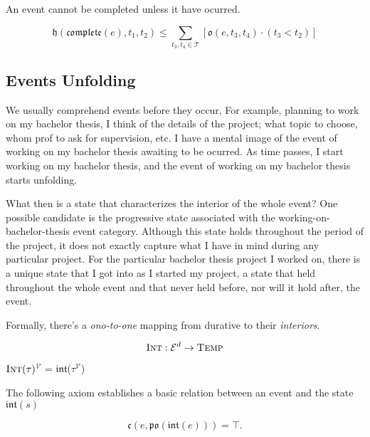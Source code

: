 An event cannot be completed unless it have ocurred.

\begin{axiom}
	\begin{equation}
		\mathfrak{h}(\mathfrak{complete}(e), t_1, t_2) \leq \sum_{t_3, t_4 \in \mathcal{T}}[\mathfrak{o}(e, t_3, t_4) \cdot (t_3 < t_2)]
	\end{equation}
\end{axiom}

\subsection{Events Unfolding}
We usually comprehend events before they occur, For example, planning to work on my bachelor thesis,
I think of the details of the project; what topic to choose, whom prof to ask for supervision, etc.
I have a mental image of the event of working on my bachelor thesis awaiting to be ocurred.
As time passes, I start working on my bachelor thesis, and the event of working on my bachelor thesis starts unfolding.

What then is a state that characterizes the interior of the whole event? One possible candidate is the progressive state associated with the working-on-bachelor-thesis event category.
Although this state holds throughout the period of the project, it does not exactly capture what I have in mind during any particular project.
For the particular bachelor thesis project I worked on, there is a unique state that I got into as I started my project, a state that held throughout the whole event and that never held before, nor will it hold after, the event.

Formally, there's a \textit{ono-to-one} mapping from durative to their \textit{interiors}.
\begin{defn}
	\begin{equation}
		\textsc{Int} : \mathcal{E}^{d} \to \textsc{Temp}
	\end{equation}
\end{defn}

\begin{defn}
	\textlbrackdbl $\textsc{Int}(\tau)$\textrbrackdbl$^{\mathcal{V}}$
	= $\mathfrak{int}$(\textlbrackdbl $\tau$\textrbrackdbl$^{\mathcal{V}}$)
\end{defn}

The following axiom establishes a basic relation between an event and the state $\mathfrak{int}(s)$
\begin{axiom}\label{ax:int}
	\begin{equation}
		\mathfrak{c}(e, \mathfrak{po}(\mathfrak{int}(e))) = \top.
	\end{equation}
\end{axiom}

